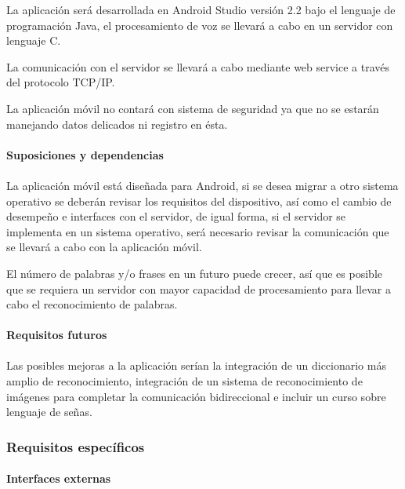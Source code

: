 La aplicación será desarrollada en Android Studio versión 2.2 bajo el lenguaje de programación Java, el procesamiento de voz se llevará a cabo en un servidor con lenguaje C.

La comunicación con el servidor se llevará a cabo mediante web service a través del protocolo TCP/IP.

La aplicación móvil no contará con sistema de seguridad ya que no se estarán manejando datos delicados ni registro en ésta.

\paragraph{Suposiciones y dependencias}\paragraph{}

La aplicación móvil está diseñada para Android, si se desea migrar a otro sistema operativo se deberán revisar los requisitos del dispositivo, así como el cambio de desempeño e interfaces con el servidor, de igual forma, si el servidor se implementa en un sistema operativo, será necesario revisar la comunicación que se llevará a cabo con la aplicación móvil.

El número de palabras y/o frases en un futuro puede crecer, así que es posible que se requiera un servidor con mayor capacidad de procesamiento para llevar a cabo el reconocimiento de palabras.

\paragraph{Requisitos futuros}\paragraph{}

Las posibles mejoras a la aplicación serían la integración de un diccionario más amplio de reconocimiento, integración de un sistema de reconocimiento de imágenes para completar la comunicación bidireccional e incluir un curso sobre lenguaje de señas.

\subsubsection{Requisitos específicos}

\paragraph{Interfaces externas}

